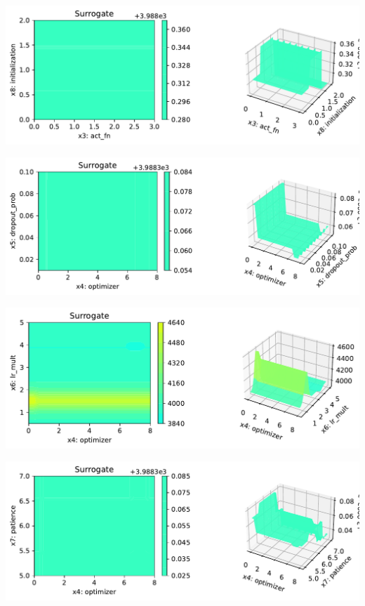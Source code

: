 \documentclass[
  letterpaper,
  DIV=11,
  numbers=noendperiod]{scrreprt}
\begin{document}
\includegraphics{031_spot_lightning_linear_diabetes_files/figure-pdf/cell-19-output-19.pdf}

\includegraphics{031_spot_lightning_linear_diabetes_files/figure-pdf/cell-19-output-20.pdf}

\includegraphics{031_spot_lightning_linear_diabetes_files/figure-pdf/cell-19-output-21.pdf}

\includegraphics{031_spot_lightning_linear_diabetes_files/figure-pdf/cell-19-output-22.pdf}
\end{document}
